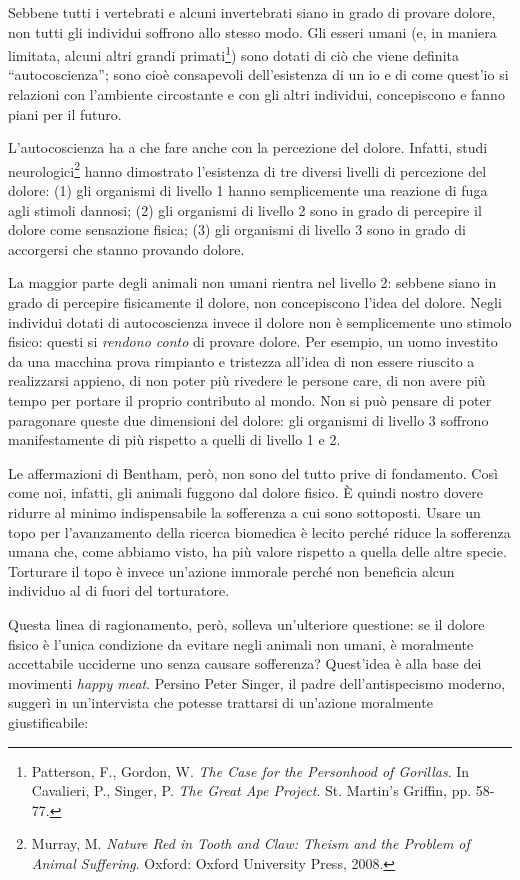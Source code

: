 \documentclass[a4paper,11pt,oneside,article]{memoir}
\begin{document}
Sebbene tutti i vertebrati e alcuni invertebrati siano in grado di provare
dolore, non tutti gli individui soffrono allo stesso modo. Gli esseri umani (e,
in maniera limitata, alcuni altri grandi primati\footnote{Patterson, F., Gordon,
W. \emph{The Case for the Personhood of Gorillas}. In Cavalieri, P., Singer, P.
\emph{The Great Ape Project}. St. Martin's Griffin, pp. 58-77.}) sono dotati di
ciò che viene definita ``autocoscienza''; sono cioè consapevoli dell'esistenza
di un io e di come quest'io si relazioni con l'ambiente circostante e con gli
altri individui, concepiscono e fanno piani per il futuro.

L'autocoscienza ha a che fare anche con la percezione del dolore. Infatti, studi
neurologici\footnote{Murray, M. \emph{Nature Red in Tooth and Claw: Theism and
the Problem of Animal Suffering}. Oxford: Oxford University Press, 2008.} hanno
dimostrato l'esistenza di tre diversi livelli di percezione del dolore: (1) gli
organismi di livello 1 hanno semplicemente una reazione di fuga agli stimoli
dannosi; (2) gli organismi di livello 2 sono in grado di percepire il dolore
come sensazione fisica; (3) gli organismi di livello 3 sono in grado di
accorgersi che stanno provando dolore.

La maggior parte degli animali non umani rientra nel livello 2: sebbene siano in
grado di percepire fisicamente il dolore, non concepiscono l'idea del dolore.
Negli individui dotati di autocoscienza invece il dolore non è semplicemente uno
stimolo fisico: questi si \emph{rendono conto} di provare dolore. Per esempio,
un uomo investito da una macchina prova rimpianto e tristezza all'idea di non
essere riuscito a realizzarsi appieno, di non poter più rivedere le persone
care, di non avere più tempo per portare il proprio contributo al mondo. Non si
può pensare di poter paragonare queste due dimensioni del dolore: gli organismi
di livello 3 soffrono manifestamente di più rispetto a quelli di livello 1 e 2.

Le affermazioni di Bentham, però, non sono del tutto prive di fondamento. Così
come noi, infatti, gli animali fuggono dal dolore fisico. È quindi nostro
dovere ridurre al minimo indispensabile la sofferenza a cui sono sottoposti.
Usare un topo per l'avanzamento della ricerca biomedica è lecito perché riduce
la sofferenza umana che, come abbiamo visto, ha più valore rispetto a quella
delle altre specie. Torturare il topo è invece un'azione immorale perché non
beneficia alcun individuo al di fuori del torturatore.

Questa linea di ragionamento, però, solleva un'ulteriore questione: se il dolore
fisico è l'unica condizione da evitare negli animali non umani, è moralmente
accettabile ucciderne uno senza causare sofferenza? Quest'idea è alla base dei
movimenti \emph{happy meat}. Persino Peter Singer, il padre dell'antispecismo
moderno, suggerì in un'intervista che potesse trattarsi di un'azione moralmente
giustificabile:
\end{document}
